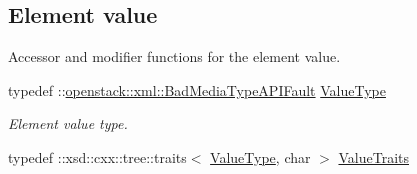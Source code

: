 \subsection*{Element value}
\label{_amgrp2ee2eae1a8c390ea033f241c027da8d6}
Accessor and modifier functions for the element value. \begin{DoxyCompactItemize}
\item 
\hypertarget{classopenstack_1_1xml_1_1BadMediaType_aed9073095a36a863e61081da6f46011b}{
typedef ::\hyperlink{classopenstack_1_1xml_1_1BadMediaTypeAPIFault}{openstack::xml::BadMediaTypeAPIFault} \hyperlink{classopenstack_1_1xml_1_1BadMediaType_aed9073095a36a863e61081da6f46011b}{ValueType}}
\label{classopenstack_1_1xml_1_1BadMediaType_aed9073095a36a863e61081da6f46011b}

\begin{DoxyCompactList}\small\item\em Element value type. \item\end{DoxyCompactList}\item 
\hypertarget{classopenstack_1_1xml_1_1BadMediaType_aee92c5ae5aae4f74d9f98b913e0cc438}{
typedef ::xsd::cxx::tree::traits$<$ \hyperlink{classopenstack_1_1xml_1_1BadMediaTypeAPIFault}{ValueType}, char $>$ \hyperlink{classopenstack_1_1xml_1_1BadMediaType_aee92c5ae5aae4f74d9f98b913e0cc438}{ValueTraits}}
\label{classopenstack_1_1xml_1_1BadMediaType_aee92c5ae5aae4f74d9f98b913e0cc438}


\end{DoxyCompactItemize}
